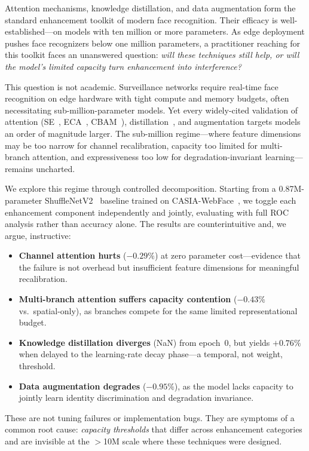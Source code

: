 \documentclass[journal,10pt]{IEEEtran}
\begin{document}
Attention mechanisms, knowledge distillation, and data augmentation form the standard enhancement toolkit of modern face recognition. Their efficacy is well-established---on models with ten million or more parameters. As edge deployment pushes face recognizers below one million parameters, a practitioner reaching for this toolkit faces an unanswered question: \emph{will these techniques still help, or will the model's limited capacity turn enhancement into interference?}

This question is not academic. Surveillance networks require real-time face recognition on edge hardware with tight compute and memory budgets, often necessitating sub-million-parameter models. Yet every widely-cited validation of attention (SE~\cite{se}, ECA~\cite{eca}, CBAM~\cite{cbam}), distillation~\cite{kd,rkd}, and augmentation targets models an order of magnitude larger. The sub-million regime---where feature dimensions may be too narrow for channel recalibration, capacity too limited for multi-branch attention, and expressiveness too low for degradation-invariant learning---remains uncharted.

We explore this regime through controlled decomposition. Starting from a 0.87M-parameter ShuffleNetV2~\cite{shufflenetv2} baseline trained on CASIA-WebFace~\cite{casia}, we toggle each enhancement component independently and jointly, evaluating with full ROC analysis rather than accuracy alone. The results are counterintuitive and, we argue, instructive:

\begin{itemize}
\item \textbf{Channel attention hurts} ($-0.29\%$) at zero parameter cost---evidence that the failure is not overhead but insufficient feature dimensions for meaningful recalibration.
\item \textbf{Multi-branch attention suffers capacity contention} ($-0.43\%$ vs.\ spatial-only), as branches compete for the same limited representational budget.
\item \textbf{Knowledge distillation diverges} (NaN) from epoch~0, but yields $+0.76\%$ when delayed to the learning-rate decay phase---a temporal, not weight, threshold.
\item \textbf{Data augmentation degrades} ($-0.95\%$), as the model lacks capacity to jointly learn identity discrimination and degradation invariance.
\end{itemize}

These are not tuning failures or implementation bugs. They are symptoms of a common root cause: \emph{capacity thresholds} that differ across enhancement categories and are invisible at the $>$10M scale where these techniques were designed.
\end{document}
